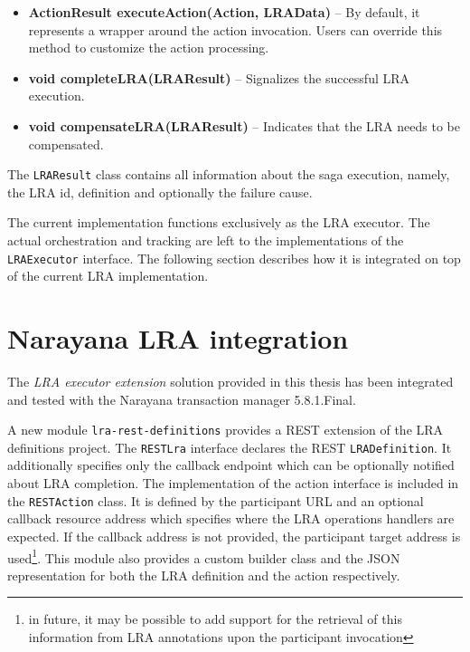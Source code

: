 \documentclass[oneside,
  digital, %
  table,   %
  lof,     %
  lot,     %
]{fithesis3}
\begin{document}
\begin{itemize}
    \item \textbf{ActionResult executeAction(Action, LRAData)} -- By default, it represents a wrapper around the action invocation. Users can override this method to customize the action processing.
    
    \item \textbf{void completeLRA(LRAResult)} -- Signalizes the successful LRA execution.
    
    \item \textbf{void compensateLRA(LRAResult)} -- Indicates that the LRA needs to be compensated.
\end{itemize}

The \texttt{LRAResult} class contains all information about the saga execution, namely, the LRA id, definition and optionally the failure cause.

The current implementation functions exclusively as the LRA executor. The actual orchestration and tracking are left to the implementations of the \texttt{LRAExecutor} interface. The following section describes how it is integrated on top of the current LRA implementation. 

\section{Narayana LRA integration}
\label{sec:narayana-lra-integration}

The \textit{LRA executor extension} solution provided in this thesis has been integrated and tested with the Narayana transaction manager 5.8.1.Final. 

A new module \texttt{lra-rest-definitions} provides a REST extension of the LRA definitions project. The \texttt{RESTLra} interface declares the REST \texttt{LRADefinition}. It additionally specifies only the callback endpoint which can be optionally notified about LRA completion. The implementation of the action interface is included in the \texttt{RESTAction} class. It is defined by the participant URL and an optional callback resource address which specifies where the LRA operations handlers are expected. If the callback address is not provided, the participant target address is used\footnote{in future, it may be possible to add support for the retrieval of this information from LRA annotations upon the participant invocation}. This module also provides a custom builder class and the JSON representation for both the LRA definition and the action respectively.
\end{document}
